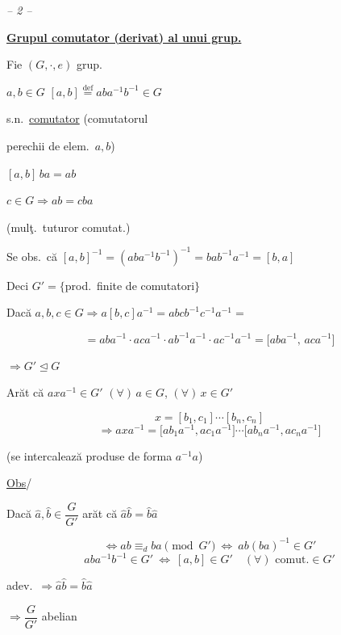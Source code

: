 \documentclass[12pt]{article}
\begin{document}
\begin{center}
\textit{-- 2 --}
\end{center}

\noindent\underline{\textbf{Grupul comutator (derivat) al unui grup.}}

\bigskip
\noindent Fie $(G,\cdot,e)$ grup.

\noindent $a,b\in G$ \quad $[a,b] \overset{\text{def}}{=} aba^{-1}b^{-1}\in G$

\noindent s.n.\ \underline{comutator} (comutatorul

\noindent perechii de elem.\ $a,b$)

\bigskip
\noindent $[a,b]\,ba = ab$

\noindent $c\in G \Rightarrow ab=cba$

\bigskip
\noindent{} \quad (mulţ.\ tuturor comutat.)

\bigskip
\noindent Se obs.\ că $[a,b]^{-1} = (aba^{-1}b^{-1})^{-1} = bab^{-1}a^{-1} = [b,a]$

\noindent Deci $G' = \{$prod.\ finite de comutatori$\}$

\bigskip
\noindent Dacă $a,b,c\in G \Rightarrow a[b,c]a^{-1} = abcb^{-1}c^{-1}a^{-1} =$

\[
= aba^{-1}\cdot aca^{-1}\cdot ab^{-1}a^{-1}\cdot ac^{-1}a^{-1} = \big[aba^{-1},\,aca^{-1}\big]
\]

\noindent $\Rightarrow G'\trianglelefteq G$

\bigskip
\noindent Arăt că $axa^{-1}\in G'$ $(\forall)\,a\in G$, $(\forall)\,x\in G'$

\[
x=[b_1,c_1]\cdots[b_n,c_n]
\]
\[
\Rightarrow axa^{-1} = \big[ab_1a^{-1},ac_1a^{-1}\big]\cdots\big[ab_na^{-1},ac_na^{-1}\big]
\]

\noindent (se intercalează produse de forma $a^{-1}a$)

\bigskip
\noindent\underline{Obs}/ \quad {}

\bigskip
\noindent Dacă $\hat a,\hat b\in \dfrac{G}{G'}$ arăt că $\hat a\hat b=\hat b\hat a$

\[
\Leftrightarrow ab\equiv_{d} ba \pmod{G'} \ \Leftrightarrow \ ab(ba)^{-1}\in G'
\]
\[
aba^{-1}b^{-1}\in G' \ \Leftrightarrow \ [a,b]\in G' \quad (\forall)\text{ comut.}\in G'
\]

\noindent adev.\ $\Rightarrow \hat a\hat b=\hat b\hat a$

\noindent $\Rightarrow \dfrac{G}{G'}$ abelian
\end{document}
